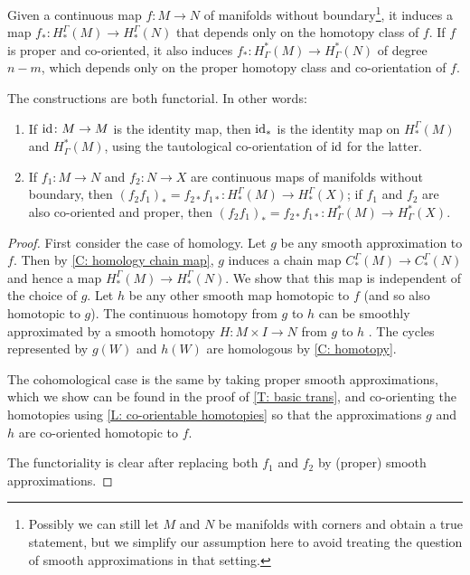 \begin{theorem}\label{T: homology homotopy functor}
	Given a \textnormal{continuous} map $f \colon M \to N$ of manifolds without boundary\footnote{Possibly we can still let $M$ and $N$ be manifolds with corners and obtain a true statement, but we simplify our assumption here to avoid treating the question of smooth approximations in that setting.}, it induces a map $f_* \colon H_*^\Gamma(M) \to H_*^\Gamma(N)$ that depends only on the homotopy class of $f$.
	If $f$ is proper and co-oriented, it also induces $f_* \colon H^*_\Gamma(M) \to H^*_\Gamma(N)$ of degree $n-m$, which depends only on the proper homotopy class and co-orientation of $f$.

	The constructions are both functorial.
	In other words:
	\begin{enumerate}
		\item If $\mathrm{id} \colon M \to M$ is the identity map, then $\mathrm{id}_*$ is the identity map on $H_*^\Gamma(M)$ and $H^*_\Gamma(M)$, using the tautological co-orientation of $\mathrm{id}$ for the latter.
		\item  If $f_1 \colon M \to N$ and $f_2 \colon N \to X$ are continuous maps of manifolds without boundary, then $(f_2f_1)_* = f_{2*}f_{1*} \colon H_*^\Gamma(M) \to H_*^\Gamma(X)$; if $f_1$ and $f_2$ are also co-oriented and proper, then $(f_2f_1)_* = f_{2*}f_{1*} \colon H^*_\Gamma(M) \to H^*_\Gamma(X)$.
	\end{enumerate}
\end{theorem}

\begin{proof}
	First consider the case of homology.
	Let $g$ be any smooth approximation to $f$.
	Then by \cref{C: homology chain map}, $g$ induces a chain map $C_*^\Gamma(M) \to C_*^\Gamma(N)$ and hence a map $H_*^\Gamma(M) \to H_*^\Gamma(N)$.
	We show that this map is independent of the choice of $g$.
	Let $h$ be any other smooth map homotopic to $f$ (and so also homotopic to $g$).
	The continuous homotopy from $g$ to $h$ can be smoothly approximated by a smooth homotopy $H \colon M \times I \to N$ from $g$ to $h$ \cite[Theorem III.2.5]{Kos93}.
	The cycles represented by $g(W)$ and $h(W)$ are homologous by \cref{C: homotopy}.


	The cohomological case is the same by taking proper smooth approximations, which we show can be found in the proof of \cref{T: basic trans}, and co-orienting the homotopies using \cref{L: co-orientable homotopies} so that the approximations $g$ and $h$ are co-oriented homotopic to $f$.

	The functoriality is clear after replacing both $f_1$ and $f_2$ by (proper) smooth approximations.
\end{proof}

